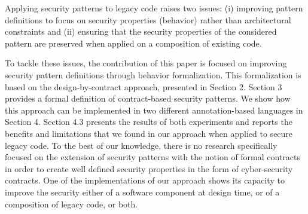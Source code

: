 Applying security patterns to legacy code raises two issues: (i) improving pattern definitions to focus on security properties (behavior) rather than architectural constraints and (ii) ensuring that the security properties of the considered pattern are preserved when applied on a composition of existing code.


To tackle these issues, the contribution of this paper is focused on improving security pattern definitions through behavior formalization. This formalization is based on the design-by-contract approach, presented in Section 2.
 Section 3 provides a formal definition of contract-based security patterns.
We show how this approach can be implemented in two different annotation-based languages in Section 4. 
Section 4.3 presents the results of both experiments and reports the benefits and limitations that we found in our approach when applied to secure legacy code.
To the best of our knowledge, there is no research specifically focused on the extension of security patterns with the notion of formal contracts in order to create well defined security properties in the form of cyber-security contracts. One of the implementations of our approach shows its capacity to improve the security either of a software component at design time, or of a composition of legacy code, or both.



